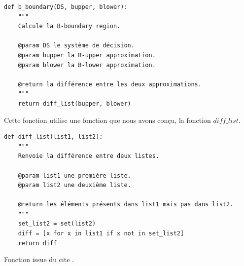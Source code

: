 \begin{lstlisting}
def b_boundary(DS, bupper, blower):
	"""
	Calcule la B-boundary region.

	@param DS le système de décision.
	@param bupper la B-upper approximation.
	@param blower la B-lower approximation.

	@return la différence entre les deux approximations.
	"""
	return diff_list(bupper, blower)
\end{lstlisting}
Cette fonction utilise une fonction que nous avons conçu, la fonction
$diff\_list$.
\newpage
\begin{lstlisting}
def diff_list(list1, list2):
	"""
	Renvoie la différence entre deux listes.

	@param list1 une première liste.
	@param list2 une deuxième liste.

	@return les éléments présents dans list1 mais pas dans list2.
	"""
	set_list2 = set(list2)
	diff = [x for x in list1 if x not in set_list2]
	return diff
\end{lstlisting}
Fonction issue du cite \cite{diff_list}.
